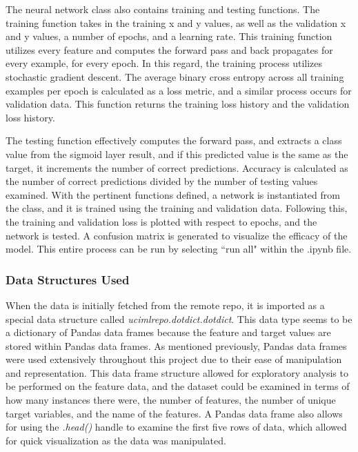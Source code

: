 \documentclass[a4paper]{article}
\begin{document}
The neural network class also contains training and testing functions. The training function takes in the training x and y values, as well as the validation x and y values, a number of epochs, and a learning rate. This training function utilizes every feature and computes the forward pass and back propagates for every example, for every epoch. In this regard, the training process utilizes stochastic gradient descent. The average binary cross entropy across all training examples per epoch is calculated as a loss metric, and a similar process occurs for validation data. This function returns the training loss history and the validation loss history. 

The testing function effectively computes the forward pass, and extracts a class value from the sigmoid layer result, and if this predicted value is the same as the target, it increments the number of correct predictions. Accuracy is calculated as the number of correct predictions divided by the number of testing values examined. With the pertinent functions defined, a network is instantiated from the class, and it is trained using the training and validation data. Following this, the training and validation loss is plotted with respect to epochs, and the network is tested. A confusion matrix is generated to visualize the efficacy of the model. This entire process can be run by selecting ``run all" within the .ipynb file.


\subsubsection{Data Structures Used}

When the data is initially fetched from the remote repo, it is imported as a special data structure called \textit{ucimlrepo.dotdict.dotdict}. This data type seems to be a dictionary of Pandas data frames because the feature and target values are stored within Pandas data frames. As mentioned previously, Pandas data frames were used extensively throughout this project due to their ease of manipulation and representation. This data frame structure allowed for exploratory analysis to be performed on the feature data, and the dataset could be examined in terms of how many instances there were, the number of features, the number of unique target variables, and the name of the features. A Pandas data frame also allows for using the \textit{.head()} handle to examine the first five rows of data, which allowed for quick visualization as the data was manipulated.
\end{document}
